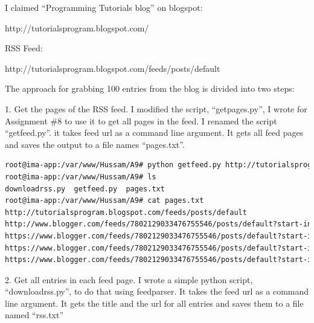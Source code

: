 \documentclass[a4paper, 11pt]{article}
\begin{document}
I claimed ``Programming Tutorials blog'' on blogspot:

http://tutorialsprogram.blogspot.com/

RSS Feed:

http://tutorialsprogram.blogspot.com/feeds/posts/default

The approach for grabbing 100 entries from the blog is divided into two steps:

1. Get the pages of the RSS feed. I modified the script, ``getpages.py'', I wrote for Assignment \#8 to use it to get all pages in the feed. I renamed the script ``getfeed.py''. it takes feed url as a command line argument. It gets all feed pages and saves the output to a file names ``pages.txt''.



\begin{lstlisting}[language=bash, breakatwhitespace=〈false), label=Running getfeed.py, caption= Running getfeed.py]
root@ima-app:/var/www/Hussam/A9# python getfeed.py http://tutorialsprogram.blogspot.com/feeds/posts/default
root@ima-app:/var/www/Hussam/A9# ls
downloadrss.py  getfeed.py  pages.txt
root@ima-app:/var/www/Hussam/A9# cat pages.txt
http://tutorialsprogram.blogspot.com/feeds/posts/default
http://www.blogger.com/feeds/7802129033476755546/posts/default?start-index=26&max-results=25
https://www.blogger.com/feeds/7802129033476755546/posts/default?start-index=51&max-results=25
https://www.blogger.com/feeds/7802129033476755546/posts/default?start-index=76&max-results=25
https://www.blogger.com/feeds/7802129033476755546/posts/default?start-index=101&max-results=25
\end{lstlisting}

2. Get all entries in each feed page. I wrote a simple python script, ``downloadrss.py'', to do that using feedparser. It takes the feed url as a command line argument. It gets the title and the url for all entries and saves them to a file named ``rss.txt''


\end{document}
